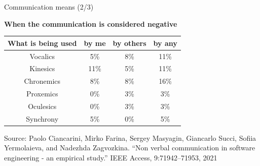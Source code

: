 \documentclass{beamer}
\begin{document}
\begin{frame}
{\centerline{Communication means (2/3)}}

\begin{center}
\textbf{When the communication is considered negative}
\end{center}

\begin{center}
\centering
\begin{tabular}{|c|c|c|c|}
\hline
{\textbf{What is being used}} & {\textbf{by me}} & \textbf{by others} & \textbf{by any}\\
\hline
{Vocalics} & 5\% & 8\% & 11\% \\
\hline
{Kinesics} & 11\% & 5\% & 11\% \\
\hline
{Chronemics} & 8\% & 8\% & 16\%\\
\hline
{Proxemics} & 0\% & 3\% & 3\%\\
\hline
{Oculesics} &  0\% & 3\% & 3\%\\
\hline
 {Synchrony} & 5\% & 0\% & 5\%\\
\hline
\end{tabular}
\end{center}

\begin{center}
    \tiny{Source: Paolo Ciancarini, Mirko Farina, Sergey Masyagin, Giancarlo Succi, Sofiia Yermolaieva, and Nadezhda Zagvozkina. ``Non verbal communication in software engineering - an empirical study.'' IEEE Access, 9:71942–71953, 2021}
\end{center}

\end{frame}
\end{document}

